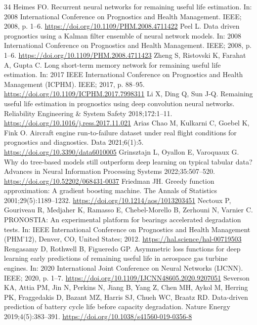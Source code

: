 \documentclass[a4paper,fleqn,doubleblind]{cas-dc}
\begin{document}
\begin{thebibliography}{34}
 Heimes FO. Recurrent neural networks for remaining useful life estimation. In: 2008 International Conference on Prognostics and Health Management. IEEE; 2008, p. 1--6. \url{https://doi.org/10.1109/PHM.2008.4711422}
 Peel L. Data driven prognostics using a Kalman filter ensemble of neural network models. In: 2008 International Conference on Prognostics and Health Management. IEEE; 2008, p. 1--6. \url{https://doi.org/10.1109/PHM.2008.4711423}
 Zheng S, Ristovski K, Farahat A, Gupta C. Long short-term memory network for remaining useful life estimation. In: 2017 IEEE International Conference on Prognostics and Health Management (ICPHM). IEEE; 2017, p. 88--95. \url{https://doi.org/10.1109/ICPHM.2017.7998311}
 Li X, Ding Q, Sun J-Q. Remaining useful life estimation in prognostics using deep convolution neural networks. Reliability Engineering \& System Safety 2018;172:1--11. \url{https://doi.org/10.1016/j.ress.2017.11.021}
 Arias Chao M, Kulkarni C, Goebel K, Fink O. Aircraft engine run-to-failure dataset under real flight conditions for prognostics and diagnostics. Data 2021;6(1):5. \url{https://doi.org/10.3390/data6010005}
 Grinsztajn L, Oyallon E, Varoquaux G. Why do tree-based models still outperform deep learning on typical tabular data? Advances in Neural Information Processing Systems 2022;35:507--520. \url{https://doi.org/10.52202/068431-0037}
 Friedman JH. Greedy function approximation: A gradient boosting machine. The Annals of Statistics 2001;29(5):1189--1232. \url{https://doi.org/10.1214/aos/1013203451}
 Nectoux P, Gouriveau R, Medjaher K, Ramasso E, Chebel-Morello B, Zerhouni N, Varnier C. PRONOSTIA: An experimental platform for bearings accelerated degradation tests. In: IEEE International Conference on Prognostics and Health Management (PHM'12), Denver, CO, United States; 2012. \url{https://hal.science/hal-00719503}
 Rengasamy D, Rothwell B, Figueredo GP. Asymmetric loss functions for deep learning early predictions of remaining useful life in aerospace gas turbine engines. In: 2020 International Joint Conference on Neural Networks (IJCNN). IEEE; 2020, p. 1--7. \url{https://doi.org/10.1109/IJCNN48605.2020.9207051}
 Severson KA, Attia PM, Jin N, Perkins N, Jiang B, Yang Z, Chen MH, Aykol M, Herring PK, Fraggedakis D, Bazant MZ, Harris SJ, Chueh WC, Braatz RD. Data-driven prediction of battery cycle life before capacity degradation. Nature Energy 2019;4(5):383--391. \url{https://doi.org/10.1038/s41560-019-0356-8}

\end{thebibliography}
\end{document}

